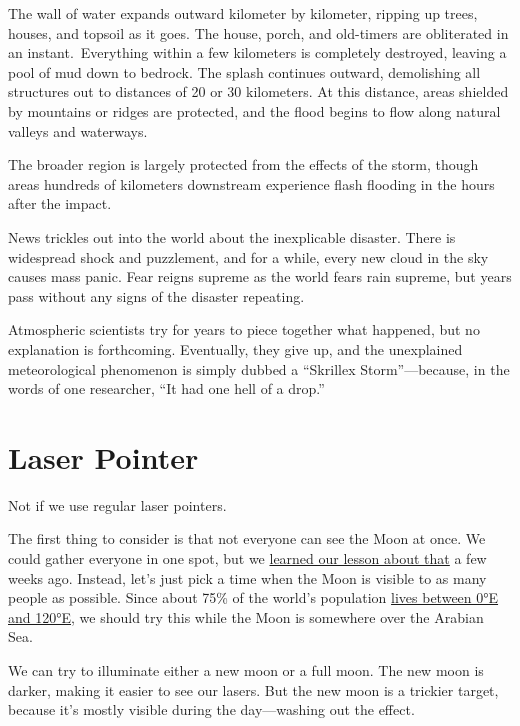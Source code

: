 {The wall of water expands outward kilometer by kilometer, ripping up trees, houses, and topsoil as it goes. The house, porch, and old-timers are obliterated in an instant. Everything within a few kilometers is completely destroyed, leaving a pool of mud down to bedrock. The splash continues outward, demolishing all structures out to distances of 20 or 30 kilometers. At this distance, areas shielded by mountains or ridges are protected, and the flood begins to flow along natural valleys and waterways.}

{The broader region is largely protected from the effects of the storm, though areas hundreds of kilometers downstream experience flash flooding in the hours after the impact.}

{News trickles out into the world about the inexplicable disaster. There is widespread shock and puzzlement, and for a while, every new cloud in the sky causes mass panic. Fear reigns supreme as the world fears rain supreme, but years pass without any signs of the disaster repeating.}

{Atmospheric scientists try for years to piece together what happened, but no explanation is forthcoming. Eventually, they give up, and the unexplained meteorological phenomenon is simply dubbed a “Skrillex Storm”—because, in the words of one researcher, “It had one hell of a drop.”}

{
\chapter{Laser Pointer}
}

\hfill{}

{Not if we use regular laser pointers.}

{The first thing to consider is that not everyone can see the Moon at once. We could gather everyone in one spot, but we \href{http://what-if.xkcd.com/8/}{learned our lesson about that} a few weeks ago. Instead, let’s just pick a time when the Moon is visible to as many people as possible. Since about 75\% of the world’s population \href{http://www.good.is/posts/mapping-the-world-s-population-by-latitude-longitude/} {lives between 0°E and 120°E}, we should try this while the Moon is somewhere over the Arabian Sea.}

{We can try to illuminate either a new moon or a full moon. The new moon is darker, making it easier to see our lasers. But the new moon is a trickier target, because it’s mostly visible during the day—washing out the effect.}


